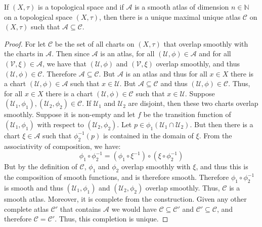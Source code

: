     \begin{theorem}
        If $(X,\tau)$ is a topological space and if $\mathcal{A}$ is a
        smooth atlas of dimension $n\in\mathbb{N}$ on a topological space
        $(X,\tau)$, then there is a unique maximal unique atlas
        $\mathcal{C}$ on $(X,\tau)$ such that
        $\mathcal{A}\subseteq\mathcal{C}$.
    \end{theorem}
    \begin{proof}
        For let $\mathcal{C}$ be the set of all charts on $(X,\tau)$ that
        overlap smoothly with the charts in $\mathcal{A}$. Then since
        $\mathcal{A}$ is an atlas, for all
        $(\mathcal{U},\phi)\in\mathcal{A}$ and for all
        $(\mathcal{V},\xi)\in\mathcal{A}$, we have that $(\mathcal{U},\phi)$
        and $(\mathcal{V},\xi)$ overlap smoothly, and thus
        $(\mathcal{U},\phi)\in\mathcal{C}$. Therefore
        $\mathcal{A}\subseteq\mathcal{C}$. But $\mathcal{A}$ is an
        atlas and thus for all $x\in{X}$ there is a chart
        $(\mathcal{U},\phi)\in\mathcal{A}$ such that $x\in\mathcal{U}$.
        But $\mathcal{A}\subseteq\mathcal{C}$ and thus
        $(\mathcal{U},\phi)\in\mathcal{C}$. Thus, for all $x\in{X}$ there
        is a chart $(\mathcal{U},\phi)\in\mathcal{C}$ such that
        $x\in\mathcal{U}$. Suppose
        $(\mathcal{U}_{1},\phi_{1}),%
         (\mathcal{U}_{2},\phi_{2})\in\mathcal{C}$.
        If $\mathcal{U}_{1}$ and $\mathcal{U}_{2}$ are disjoint, then
        these two charts overlap smoothly. Suppose it is non-empty and let
        $f$ be the transition function of $(\mathcal{U}_{1},\phi_{1})$ with
        respect to $(\mathcal{U}_{2},\phi_{2})$. Let
        $p\in\phi_{1}(\mathcal{U}_{1}\cap\mathcal{U}_{2})$. But then there
        is a chart $\xi\in\mathcal{A}$ such that $\phi_{2}^{\minus{1}}(p)$
        is contained in the domain of $\xi$. From the associativity of
        composition, we have:
        \begin{equation}
            \phi_{1}\circ\phi_{2}^{\minus{1}}
            =(\phi_{1}\circ\xi^{\minus{1}})\circ
             (\xi\circ\phi_{2}^{\minus{1}})
        \end{equation}
        But by the definition of $\mathcal{C}$, $\phi_{1}$ and $\phi_{2}$
        overlap smoothly with $\xi$, and thus this is the composition of
        smooth functions, and is therefore smooth. Therefore
        $\phi_{1}\circ\phi_{2}^{\minus{1}}$ is smooth and thus
        $(\mathcal{U}_{1},\phi_{1})$ and $(\mathcal{U}_{2},\phi_{2})$
        overlap smoothly. Thus, $\mathcal{C}$ is a smooth atlas. Moreover,
        it is complete from the construction. Given any other complete
        atlas $\mathcal{C}'$ that contains $\mathcal{A}$ we would have
        $\mathcal{C}\subseteq\mathcal{C}'$ and
        $\mathcal{C}'\subseteq\mathcal{C}$, and therefore
        $\mathcal{C}=\mathcal{C}'$. Thus, this completion is unique.
    \end{proof}
